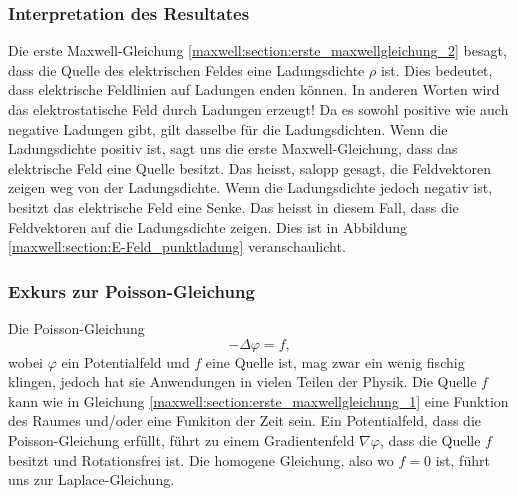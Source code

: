 \subsubsection{Interpretation des Resultates}
Die erste Maxwell-Gleichung \eqref{maxwell:section:erste_maxwellgleichung_2} besagt, dass die Quelle des elektrischen Feldes eine Ladungsdichte $\rho$ ist.
Dies bedeutet, dass elektrische Feldlinien auf Ladungen enden können.
In anderen Worten wird das elektrostatische Feld durch Ladungen erzeugt!
Da es sowohl positive wie auch negative Ladungen gibt, gilt dasselbe für die Ladungsdichten.
Wenn die Ladungsdichte positiv ist, sagt uns die erste Maxwell-Gleichung, dass das elektrische Feld eine Quelle besitzt.
Das heisst, salopp gesagt, die Feldvektoren zeigen weg von der Ladungsdichte.
Wenn die Ladungsdichte jedoch negativ ist, besitzt das elektrische Feld eine Senke.
Das heisst in diesem Fall, dass die Feldvektoren auf die Ladungsdichte zeigen. Dies ist in Abbildung \ref{maxwell:section:E-Feld_punktladung} veranschaulicht.

\subsubsection{Exkurs zur Poisson-Gleichung}
Die Poisson-Gleichung
\[
-\Delta\varphi
=
f,
\]
wobei $\varphi$ ein Potentialfeld und $f$ eine Quelle ist, mag zwar ein wenig fischig klingen, jedoch hat sie Anwendungen in vielen Teilen der Physik.
Die Quelle $f$ kann wie in Gleichung \eqref{maxwell:section:erste_maxwellgleichung_1} eine Funktion des Raumes und/oder eine Funkiton der Zeit sein.
Ein Potentialfeld, dass die Poisson-Gleichung erfüllt, führt zu einem Gradientenfeld $\nabla\varphi$, dass die Quelle $f$ besitzt und Rotationsfrei ist.
Die homogene Gleichung, also wo $f = 0$ ist, führt uns zur Laplace-Gleichung.







